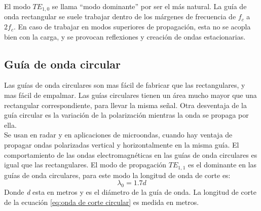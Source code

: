 \documentclass[
	12pt, %
	fleqn, %
	a4paper, %
	oneside, %
]{LegrandOrangeBook}
\begin{document}
El modo $TE_{1,0}$ se llama ``modo dominante'' por ser el más natural. La guía de onda rectangular se suele trabajar dentro de los márgenes de frecuencia de $f_c$ a $2f_c$. En caso de trabajar en modos superiores de propagación, esta no se acopla bien con la carga, y se provocan reflexiones y creación de ondas estacionarias.
\subsection{Guía de onda circular}
Las guías de onda circulares son mas fácil de fabricar que las rectangulares, y mas fácil de empalmar. Las guías circulares tienen un área mucho mayor que una rectangular correspondiente, para llevar la misma señal. Otra desventaja de la guía circular es la variación de la polarización mientras la onda se propaga por ella.\\
Se usan en radar y en aplicaciones de microondas, cuando hay ventaja de propagar ondas polarizadas vertical y horizontalmente en la misma guía.
El comportamiento de las ondas electromagnéticas en las guías de onda circulares es igual que las rectangulares. El modo de propagación $TE_{1,1}$ es el dominante en las guías de onda circulares, para este modo la longitud de onda de corte es:
\begin{equation}
\lambda_0=1.7d
\label{eq:onda de corte circular}
\end{equation}
Donde \textit{d} esta en metros y es el diámetro de la guía de onda. La longitud de corte de la ecuación \ref{eq:onda de corte circular} es medida en metros.
\end{document}
